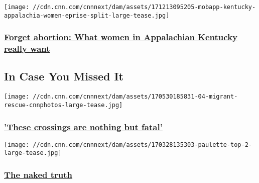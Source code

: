 \begin{itemize}
  \texttt{[image: //cdn.cnn.com/cnnnext/dam/assets/171213095205-mobapp-kentucky-appalachia-women-eprise-split-large-tease.jpg]}

  \hypertarget{forget-abortion-what-women-in-appalachian-kentucky-really-want}{%
  \subsubsection{\texorpdfstring{\href{/2017/12/13/health/kentucky-appalachia-women-eprise/index.html}{Forget
  abortion: What women in Appalachian Kentucky really
  want}}{Forget abortion: What women in Appalachian Kentucky really want}}\label{forget-abortion-what-women-in-appalachian-kentucky-really-want}}
\end{itemize}

\hypertarget{in-case-you-missed-it-}{%
\subsection{In Case You Missed It~}\label{in-case-you-missed-it-}}

\href{http://www.cnn.com/interactive/2016/08/world/dangerous-migrant-crossings-mediterranean/index.html}{}

\texttt{[image: //cdn.cnn.com/cnnnext/dam/assets/170530185831-04-migrant-rescue-cnnphotos-large-tease.jpg]}

\hypertarget{these-crossings-are-nothing-but-fatal}{%
\subsubsection{\texorpdfstring{\href{http://www.cnn.com/interactive/2016/08/world/dangerous-migrant-crossings-mediterranean/index.html}{'These
crossings are nothing but
fatal'}}{'These crossings are nothing but fatal'}}\label{these-crossings-are-nothing-but-fatal}}

\href{/2017/03/31/health/hfr-paulette-leaphart-naked-truth/index.html}{}

\texttt{[image: //cdn.cnn.com/cnnnext/dam/assets/170328135303-paulette-top-2-large-tease.jpg]}

\hypertarget{the-naked-truth}{%
\subsubsection{\texorpdfstring{\href{/2017/03/31/health/hfr-paulette-leaphart-naked-truth/index.html}{The
naked truth}}{The naked truth}}\label{the-naked-truth}}

\href{/2017/10/12/health/uganda-adoptions-investigation-ac360/index.html}{}

